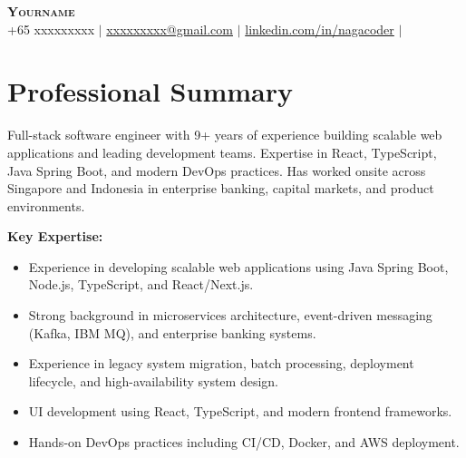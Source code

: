 \documentclass[letterpaper,11pt]{article}
\begin{document}

\begin{center}
    \textbf{\Huge \scshape Yourname} \\ \vspace{3pt}
    \small
    \faPhone \hspace{.5pt} {+65 xxxxxxxxx}
    $|$
    \faAt \hspace{.5pt} \href{mailto:xxxxxxxxx@gmail.com}{xxxxxxxxx@gmail.com}
    $|$
    \faLinkedinSquare \hspace{.5pt} \href{https://www.linkedin.com/in/nagacoder}{linkedin.com/in/nagacoder}
    $|$
    \faMapMarker \hspace{.5pt}{Tampines, Singapore}
\end{center}


\section{Professional Summary}
  \vspace{2pt}
  \small{Full-stack software engineer with 9+ years of experience building scalable web applications and leading development teams. Expertise in React, TypeScript, Java Spring Boot, and modern DevOps practices. Has worked onsite across Singapore and Indonesia in enterprise banking, capital markets, and product environments.}
  \vspace{4pt}

  \textbf{Key Expertise:}
  \begin{itemize}[leftmargin=0.2in, itemsep=-2pt, topsep=2pt]
    \small
    \item Experience in developing scalable web applications using Java Spring Boot, Node.js, TypeScript, and React/Next.js.
    \item Strong background in microservices architecture, event-driven messaging (Kafka, IBM MQ), and enterprise banking systems.
    \item Experience in legacy system migration, batch processing, deployment lifecycle, and high-availability system design.
    \item UI development using React, TypeScript, and modern frontend frameworks.
    \item Hands-on DevOps practices including CI/CD, Docker, and AWS deployment.
  \end{itemize}

\end{document}
